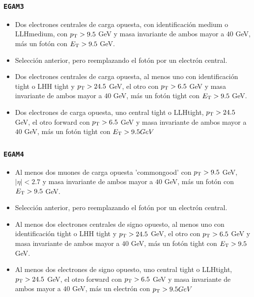 \subsubsection{\texttt{EGAM3}}
\begin{itemize}

  \item Dos electrones centrales de carga opuesta, con identificación medium o LLHmedium, con $p_{\text{T}}>9.5$ GeV y masa invariante de ambos mayor a $40$ GeV, más un fotón con $E_{\text{T}}>9.5$ GeV.

  \item Selección anterior, pero reemplazando el fotón por un electrón central.

  \item Dos electrones centrales de carga opuesta, al menos uno con identificación tight o LHH tight y $p_{\text{T}}>24.5$ GeV, el otro con $p_{\text{T}}>6.5$ GeV y masa invariante de ambos mayor a $40$ GeV, más un fotón tight con $E_{\text{T}}>9.5$ GeV.

  \item Dos electrones de carga opuesta, uno central tight o LLHtight, $p_{\text{T}}>24.5$ GeV, el otro forward con $p_{\text{T}}>6.5$ GeV y masa invariante de ambos mayor a $40$ GeV, más un fotón tight con $E_{\text{T}}>9.5 GeV$ 

\end{itemize}

\subsubsection{\texttt{EGAM4}}
\begin{itemize}

  \item Al menos dos muones de carga opuesta 'commongood' con $p_{\text{T}}>9.5$ GeV, $|\eta|<2.7$ y masa invariante de ambos mayor a $40$ GeV, más un fotón con $E_{\text{T}}>9.5$ GeV.

  \item Selección anterior, pero reemplazando el fotón por un electrón central.

  \item Al menos dos electrones centrales de signo opuesto, al menos uno con identificación tight o LHH tight y $p_{\text{T}}>24.5$ GeV, el otro con $p_{\text{T}}>6.5$ GeV y masa invariante de ambos mayor a $40$ GeV, más un fotón tight con $E_{\text{T}}>9.5$ GeV.

  \item Al menos dos electrones de signo opuesto, uno central tight o LLHtight, $p_{\text{T}}>24.5$ GeV, el otro forward con $p_{\text{T}}>6.5$ GeV y masa invariante de ambos mayor a $40$ GeV, más un electrón con $p_{\text{T}}>9.5 GeV$ 

\end{itemize}

